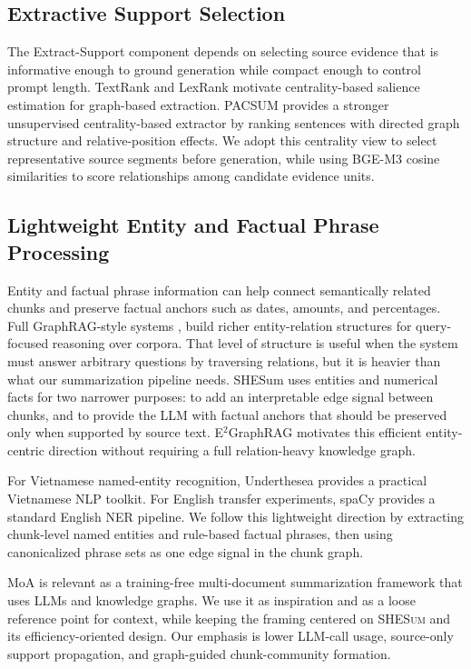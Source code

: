 \documentclass[11pt]{article}
\newcommand{\methodname}{\textsc{SHESum}}
\begin{document}
\subsection{Extractive Support Selection}

The Extract-Support component depends on selecting source evidence that is informative enough to ground generation while compact enough to control prompt length. TextRank \citep{mihalcea-tarau-2004-textrank} and LexRank \citep{Erkan_2004} motivate centrality-based salience estimation for graph-based extraction. PACSUM \citep{zheng-lapata-2019-pacsum} provides a stronger unsupervised centrality-based extractor by ranking sentences with directed graph structure and relative-position effects. We adopt this centrality view to select representative source segments before generation, while using BGE-M3 cosine similarities to score relationships among candidate evidence units.

\subsection{Lightweight Entity and Factual Phrase Processing}

Entity and factual phrase information can help connect semantically related chunks and preserve factual anchors such as dates, amounts, and percentages. Full GraphRAG-style systems \citep{edge2025localglobalgraphrag}, build richer entity-relation structures for query-focused reasoning over corpora. That level of structure is useful when the system must answer arbitrary questions by traversing relations, but it is heavier than what our summarization pipeline needs. SHESum uses entities and numerical facts for two narrower purposes: to add an interpretable edge signal between chunks, and to provide the LLM with factual anchors that should be preserved only when supported by source text. E$^2$GraphRAG \citep{zhao-2025-e2graphrag} motivates this efficient entity-centric direction without requiring a full relation-heavy knowledge graph. 

For Vietnamese named-entity recognition, Underthesea \citep{underthesea} provides a practical Vietnamese NLP toolkit. For English transfer experiments, spaCy \citep{honnibal2020spacy} provides a standard English NER pipeline. We follow this lightweight direction by extracting chunk-level named entities and rule-based factual phrases, then using canonicalized phrase sets as one edge signal in the chunk graph.

MoA \citep{tuan-2026-moa} is relevant as a training-free multi-document summarization framework that uses LLMs and knowledge graphs. We use it as inspiration and as a loose reference point for context, while keeping the framing centered on \methodname{} and its efficiency-oriented design. Our emphasis is lower LLM-call usage, source-only support propagation, and graph-guided chunk-community formation.
\end{document}
